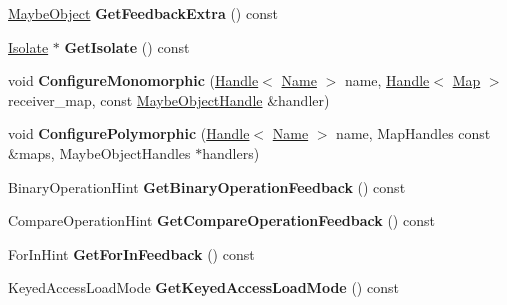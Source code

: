 \begin{DoxyCompactItemize}
\mbox{\hyperlink{classv8_1_1internal_1_1MaybeObject}{Maybe\+Object}} {\bfseries Get\+Feedback\+Extra} () const
\item 
\mbox{\label{classv8_1_1internal_1_1FeedbackNexus_a6a00b7e3f054bc0994c43824398cf111}} 
\mbox{\hyperlink{classv8_1_1internal_1_1Isolate}{Isolate}} $\ast$ {\bfseries Get\+Isolate} () const
\item 
\mbox{\label{classv8_1_1internal_1_1FeedbackNexus_a0753b7abe31f8cc12200fa01818e25b5}} 
void {\bfseries Configure\+Monomorphic} (\mbox{\hyperlink{classv8_1_1internal_1_1Handle}{Handle}}$<$ \mbox{\hyperlink{classv8_1_1internal_1_1Name}{Name}} $>$ name, \mbox{\hyperlink{classv8_1_1internal_1_1Handle}{Handle}}$<$ \mbox{\hyperlink{classv8_1_1internal_1_1Map}{Map}} $>$ receiver\+\_\+map, const \mbox{\hyperlink{classv8_1_1internal_1_1MaybeObjectHandle}{Maybe\+Object\+Handle}} \&handler)
\item 
\mbox{\label{classv8_1_1internal_1_1FeedbackNexus_ac6658ad07274c84409ecd4d3aba4cba0}} 
void {\bfseries Configure\+Polymorphic} (\mbox{\hyperlink{classv8_1_1internal_1_1Handle}{Handle}}$<$ \mbox{\hyperlink{classv8_1_1internal_1_1Name}{Name}} $>$ name, Map\+Handles const \&maps, Maybe\+Object\+Handles $\ast$handlers)
\item 
\mbox{\label{classv8_1_1internal_1_1FeedbackNexus_af6e8d9169861aef5d9c19c041141c227}} 
Binary\+Operation\+Hint {\bfseries Get\+Binary\+Operation\+Feedback} () const
\item 
\mbox{\label{classv8_1_1internal_1_1FeedbackNexus_a188cce364d6a6e6b0c7720421ed22a72}} 
Compare\+Operation\+Hint {\bfseries Get\+Compare\+Operation\+Feedback} () const
\item 
\mbox{\label{classv8_1_1internal_1_1FeedbackNexus_a3d157c6c6b27e6bc8858aeaf432154c0}} 
For\+In\+Hint {\bfseries Get\+For\+In\+Feedback} () const
\item 
\mbox{\label{classv8_1_1internal_1_1FeedbackNexus_acb435d98c28ab4afabdd6b4670f5da50}} 
Keyed\+Access\+Load\+Mode {\bfseries Get\+Keyed\+Access\+Load\+Mode} () const

\end{DoxyCompactItemize}
